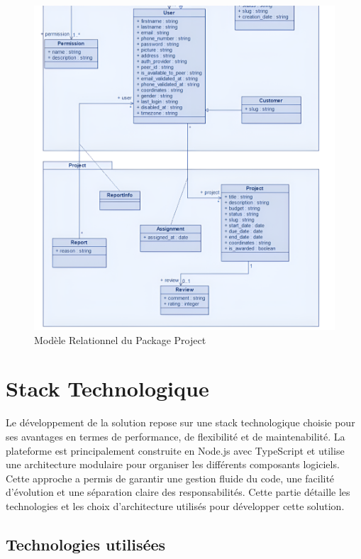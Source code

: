 \begin{figure}[H]
\begin{center}
\includegraphics[width=15cm]{assets/diagrams/ProjectUC.png}
\end{center}
\caption{Modèle Relationnel du Package Project}
\end{figure}

\vspace{0.35cm}

\section{Stack Technologique}
Le développement de la solution repose sur une stack technologique choisie pour ses avantages en termes de performance, de flexibilité et de maintenabilité. La plateforme est principalement construite en Node.js avec TypeScript et utilise une architecture modulaire pour organiser les différents composants logiciels. Cette approche a permis de garantir une gestion fluide du code, une facilité d'évolution et une séparation claire des responsabilités. Cette partie détaille les technologies et les choix d'architecture utilisés pour développer cette solution.

\subsection*{Technologies utilisées}
